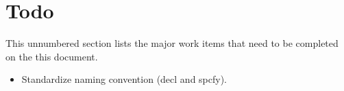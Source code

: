 
\newpage
\section*{Todo}
This unnumbered section lists the major work items that need to be
completed on the this document. 

\begin{itemize}
\item Standardize naming convention (decl and spcfy).
\end{itemize}

